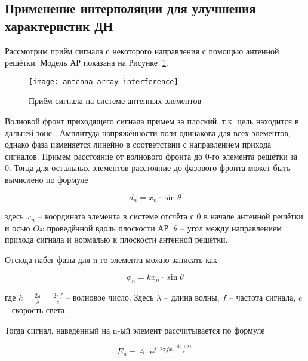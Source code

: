 \subsection{Применение интерполяции для улучшения характеристик ДН}\label{sect:interpolation-theory}

Рассмотрим приём сигнала с некоторого направления с помощью антенной решётки. 
Модель АР показана на Рисунке~\ref{fig:antenna-array-interference}.

\begin{figure}[!ht]
    \centering
    \texttt{[image: antenna-array-interference]}
    \caption{Приём сигнала на системе антенных элементов}%
    \label{fig:antenna-array-interference}
\end{figure}

Волновой фронт приходящего сигнала примем за плоский, т.к. цель находится в дальней зоне \cite{Chist2012}. 
Амплитуда напряжённости поля одинакова для всех элементов, однако фаза изменяется линейно в 
соответствии с направлением прихода сигналов. 
Примем расстояние от волнового фронта до 0-го элемента решётки за 0. 
Тогда для остальных элементов расстояние до фазового фронта может быть вычислено по формуле

\begin{equation*}
    d_n=x_n \cdot \sin\theta
\end{equation*}

\noindent здесь $x_n$ -- координата элемента в системе отсчёта с $0$ в начале антенной решётки и осью $Ox$ проведённой вдоль 
плоскости АР. $\theta$ -- угол между направлением прихода сигнала и нормалью к плоскости антенной решётки. 

Отсюда набег фазы для n-го элемента можно записать как 

\begin{equation*}
    \phi_n = k x_n \cdot \sin\theta
\end{equation*}

где $k=\frac{2\pi}{\lambda}=\frac{2\pi f}{c}$ -- волновое число. Здесь $\lambda$ -- длина волны, $f$ -- частота сигнала, $c$ -- скорость света.

Тогда сигнал, наведённый на n-ый элемент рассчитывается по формуле

\begin{equation}\label{eqn:antenna-array-element-value}
    E_n=A\cdot e^{j\cdot 2 \pi f x_n \frac{\sin{(\theta)}}{c}}
\end{equation}

